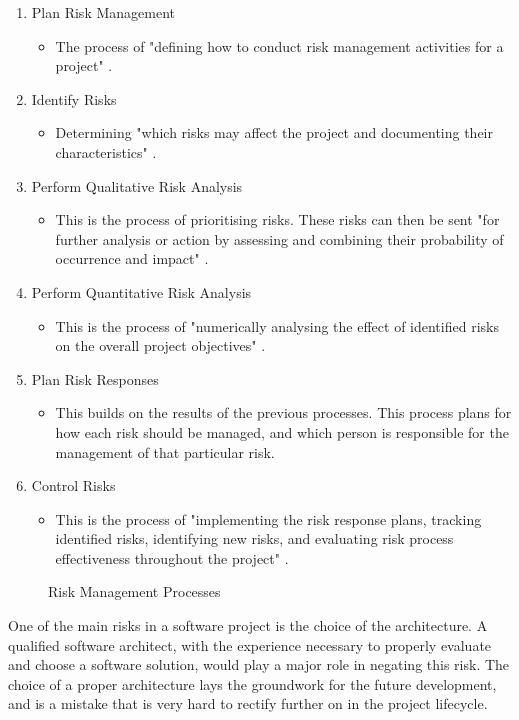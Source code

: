 \begin{enumerate}
\item Plan Risk Management
\begin{itemize}
\item The process of "defining how to conduct risk management activities for a project" \parencite{pmbok}.
\end{itemize}
\item Identify Risks
\begin{itemize}
\item Determining "which risks may affect the project and documenting their characteristics" \parencite{pmbok}.
\end{itemize}
\item Perform Qualitative Risk Analysis
\begin{itemize}
\item This is the process of prioritising risks. These risks can then be sent "for further analysis or action by assessing and combining their probability of occurrence and impact" \parencite{pmbok}.
\end{itemize}
\item Perform Quantitative Risk Analysis
\begin{itemize}
\item This is the process of "numerically analysing the effect of identified risks on the overall project objectives" \parencite{pmbok}.
\end{itemize}
\item Plan Risk Responses
\begin{itemize}
\item This builds on the results of the previous processes. This process plans for how each risk should be managed, and which person is responsible for the management of that particular risk.
\end{itemize}
\item Control Risks
\begin{itemize}
\item This is the process of "implementing the risk response plans, tracking identified risks, identifying new risks, and evaluating risk process effectiveness throughout the project" \parencite{pmbok}.
\end{itemize}
\end{enumerate}
\begin{figure}[H]
\caption{Risk Management Processes}
\label{fig:risks}
\end{figure}

One of the main risks in a software project is the choice of the architecture. A qualified software architect, with the experience necessary to properly evaluate and choose a software solution, would play a major role in negating this risk. The choice of a proper architecture lays the groundwork for the future development, and is a mistake that is very hard to rectify further on in the project lifecycle.

